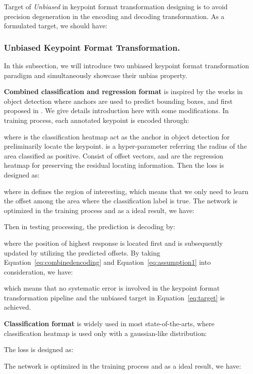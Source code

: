 \documentclass[10pt,journal,compsoc]{IEEEtran}
\begin{document}
Target of \textit{Unbiased} in keypoint format transformation designing is to avoid precision degeneration in the encoding and decoding transformation. As a formulated target, we should have:


\subsubsection{Unbiased Keypoint Format Transformation.}
In this subsection, we will introduce two unbiased keypoint format transformation paradigm and simultaneously showcase their unbias property.

\textbf{Combined classification and regression format} is inspired by the works in object detection \cite{ren2016faster} where anchors are used to predict bounding boxes, and first proposed in \cite{G-RMI}. We give details introduction here with some modifications. In training process, each annotated keypoint  is encoded through:

where  is the classification heatmap act as the anchor in object detection for preliminarily locate the keypoint.  is a hyper-parameter referring the radius of the area classified as positive. Consist of offset vectors,  and  are the regression heatmap for preserving the residual locating information. Then the loss is designed as:

where  in  defines the region of interesting, which means that we only need to learn the offset among the area where the classification label is true. The network is optimized in the training process and as a ideal result, we have:


Then in testing processing, the prediction is decoding by:

where the position of highest response  is located first and is subsequently updated by utilizing the predicted offsets. By taking Equation~\ref{eq:combinedencoding} and Equation~\ref{eq:assumption1} into consideration, we have:

which means that no systematic error is involved in the keypoint format transformation pipeline and the unbiased target in Equation~\ref{eq:target} is achieved.

\textbf{Classification format} is widely used in most state-of-the-arts, where classification heatmap is used only with a gaussian-like distribution:

The loss is designed as:

The network is optimized in the training process and as a ideal result, we have:
\end{document}
